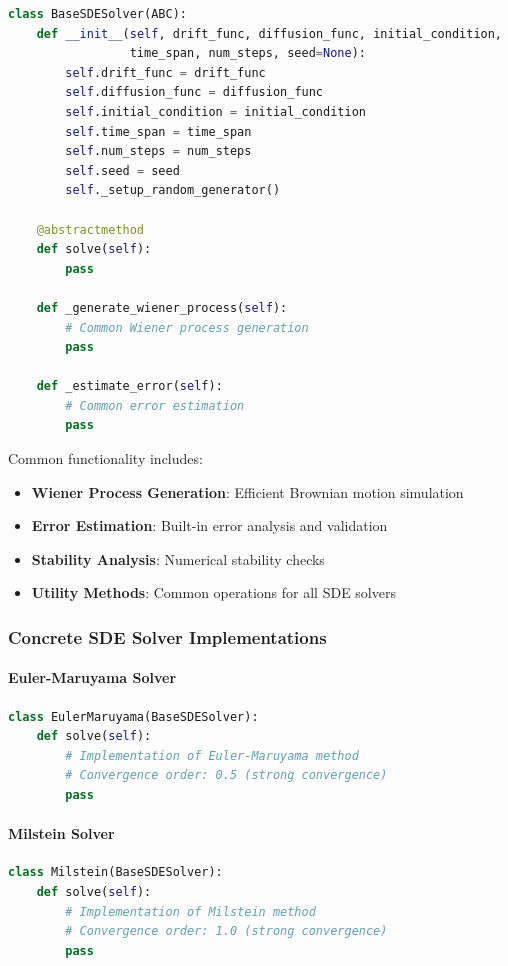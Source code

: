 \begin{lstlisting}[language=Python, caption=BaseSDESolver Base Class]
class BaseSDESolver(ABC):
    def __init__(self, drift_func, diffusion_func, initial_condition,
                 time_span, num_steps, seed=None):
        self.drift_func = drift_func
        self.diffusion_func = diffusion_func
        self.initial_condition = initial_condition
        self.time_span = time_span
        self.num_steps = num_steps
        self.seed = seed
        self._setup_random_generator()
    
    @abstractmethod
    def solve(self):
        pass
    
    def _generate_wiener_process(self):
        # Common Wiener process generation
        pass
    
    def _estimate_error(self):
        # Common error estimation
        pass
\end{lstlisting}

Common functionality includes:
\begin{itemize}
    \item \textbf{Wiener Process Generation}: Efficient Brownian motion simulation
    \item \textbf{Error Estimation}: Built-in error analysis and validation
    \item \textbf{Stability Analysis}: Numerical stability checks
    \item \textbf{Utility Methods}: Common operations for all SDE solvers
\end{itemize}

\subsubsection{Concrete SDE Solver Implementations}

\paragraph{Euler-Maruyama Solver}
\begin{lstlisting}[language=Python, caption=EulerMaruyama Implementation]
class EulerMaruyama(BaseSDESolver):
    def solve(self):
        # Implementation of Euler-Maruyama method
        # Convergence order: 0.5 (strong convergence)
        pass
\end{lstlisting}

\paragraph{Milstein Solver}
\begin{lstlisting}[language=Python, caption=Milstein Implementation]
class Milstein(BaseSDESolver):
    def solve(self):
        # Implementation of Milstein method
        # Convergence order: 1.0 (strong convergence)
        pass
\end{lstlisting}

